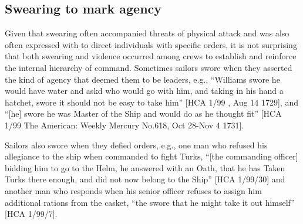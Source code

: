 \subsection{{Swearing to mark agency}}%

Given that swearing often accompanied threats of physical attack and was also often expressed with  to direct individuals with specific orders, it is not surprising that both swearing and violence occurred among crews to establish and reinforce the internal hierarchy of command. Sometimes sailors swore when they asserted the kind of agency that deemed them to be leaders, e.g., “Williams swore he would have water and askd who would go with him, and taking in his hand a hatchet, swore it should not be easy to take him” [HCA 1/99 , Aug 14 1729], and “[he] swore he was Master of the Ship and would do as he thought fit” [HCA 1/99 The American: Weekly Mercury No.618, Oct 28-Nov 4 1731]. 

Sailors also swore when they defied orders, e.g., one man who refused his allegiance to the ship when commanded to fight Turks, “[the commanding officer] bidding him to go to the Helm, he answered with an Oath, that he has Taken Turks there enough, and did not now belong to the Ship” [HCA 1/99/30] and another man who responds when his senior officer refuses to assign him additional rations from the casket, “the  swore that he might take it out himself” [HCA 1/99/7]. 


